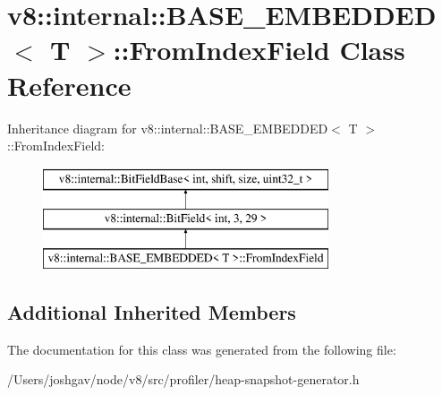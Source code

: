 \hypertarget{classv8_1_1internal_1_1_b_a_s_e___e_m_b_e_d_d_e_d_1_1_from_index_field}{}\section{v8\+:\+:internal\+:\+:B\+A\+S\+E\+\_\+\+E\+M\+B\+E\+D\+D\+ED$<$ T $>$\+:\+:From\+Index\+Field Class Reference}
\label{classv8_1_1internal_1_1_b_a_s_e___e_m_b_e_d_d_e_d_1_1_from_index_field}
Inheritance diagram for v8\+:\+:internal\+:\+:B\+A\+S\+E\+\_\+\+E\+M\+B\+E\+D\+D\+ED$<$ T $>$\+:\+:From\+Index\+Field\+:\begin{figure}[H]
\begin{center}
\leavevmode
\includegraphics[height=3.000000cm]{classv8_1_1internal_1_1_b_a_s_e___e_m_b_e_d_d_e_d_1_1_from_index_field}
\end{center}
\end{figure}
\subsection*{Additional Inherited Members}


The documentation for this class was generated from the following file\+:\begin{DoxyCompactItemize}
\item 
/\+Users/joshgav/node/v8/src/profiler/heap-\/snapshot-\/generator.\+h\end{DoxyCompactItemize}
